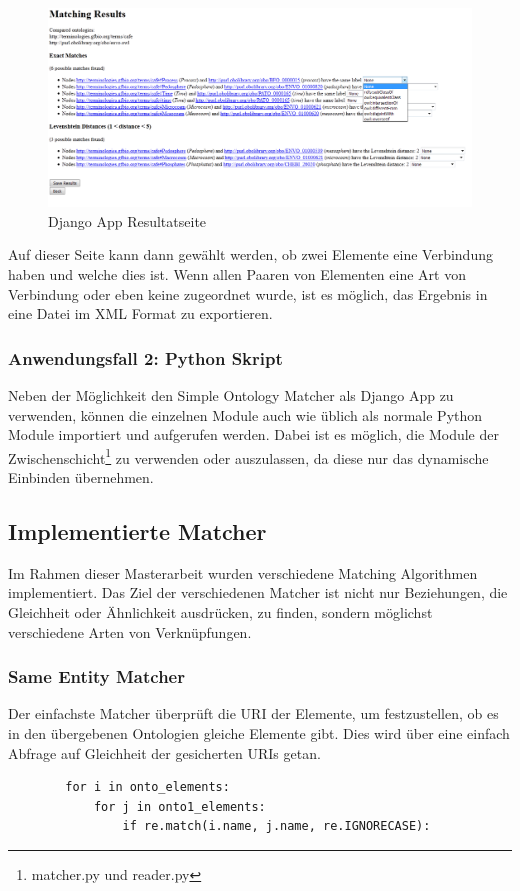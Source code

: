 		\begin{figure}[ht]
		\centering
		\includegraphics[width=1.0\textwidth]{pics/TemplateMatchingResultPage.png}
		\caption{Django App Resultatseite}
		\label{fig5}
		\end{figure}
		Auf dieser Seite kann dann gewählt werden, ob zwei Elemente eine Verbindung
		haben und welche dies ist. Wenn allen Paaren von Elementen eine Art von
		Verbindung oder eben keine zugeordnet wurde, ist es möglich, das Ergebnis in
		eine Datei im XML Format zu exportieren.
		
		\subsubsection{Anwendungsfall 2: Python Skript}
		Neben der Möglichkeit den Simple Ontology Matcher als Django App zu verwenden,
		können die einzelnen Module auch wie üblich als normale Python Module
		importiert und aufgerufen werden. Dabei ist es möglich, die Module der
		Zwischenschicht\footnote{matcher.py und reader.py} zu verwenden oder
		auszulassen, da diese nur das dynamische Einbinden übernehmen.
		
		\subsection{Implementierte Matcher}
		Im Rahmen dieser Masterarbeit wurden verschiedene Matching Algorithmen
		implementiert. Das Ziel der verschiedenen Matcher ist nicht nur Beziehungen,
		die Gleichheit oder Ähnlichkeit ausdrücken, zu finden, sondern möglichst
		verschiedene Arten von Verknüpfungen.
		
		\subsubsection{Same Entity Matcher}
		Der einfachste Matcher überprüft die URI der Elemente, um festzustellen, ob es
		in den übergebenen Ontologien gleiche Elemente gibt. Dies wird über eine
		einfach Abfrage auf Gleichheit der gesicherten URIs getan.
		\begin{lstlisting}
		for i in onto_elements:
			for j in onto1_elements:
				if re.match(i.name, j.name, re.IGNORECASE):
		\end{lstlisting}
		
